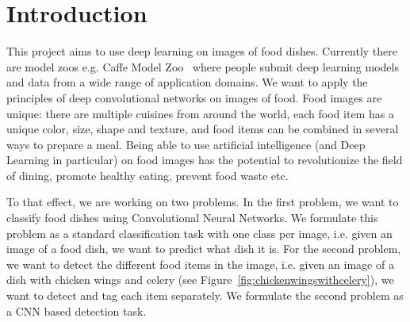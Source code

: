 \section{Introduction}


This project aims to use deep learning on images of food dishes. Currently there are model zoos e.g. Caffe Model Zoo~\cite{caffemodelzoo} where people submit deep learning models and data from a wide range of application domains. We want to apply the principles of deep convolutional networks on images of food. Food images are unique: there are multiple cuisines from around the world, each food item has a unique color, size, shape and texture, and food items can be combined in several ways to prepare a meal. Being able to use artificial intelligence (and Deep Learning in particular) on food images has the potential to revolutionize the field of dining, promote healthy eating, prevent food waste etc.

To that effect, we are working on two problems. In the first problem, we want to classify food dishes using Convolutional Neural Networks. We formulate this problem as a standard classification task with one class per image, i.e. given an image of a food dish, we want to predict what dish it is. For the second problem, we want to detect the different food items in the image, i.e. given an image of a dish with chicken wings and celery (see Figure~\ref{fig:chickenwingswithcelery}), we want to detect and tag each item separately. We formulate the second problem as a CNN based detection task.  


